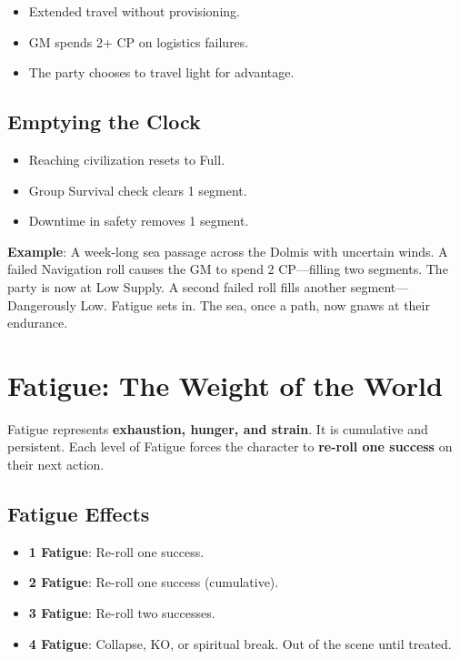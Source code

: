 \begin{itemize}
    \item Extended travel without provisioning.
    \item GM spends 2+ CP on logistics failures.
    \item The party chooses to travel light for advantage.
\end{itemize}

\subsection*{Emptying the Clock}

\begin{itemize}
    \item Reaching civilization resets to Full.
    \item Group Survival check clears 1 segment.
    \item Downtime in safety removes 1 segment.
\end{itemize}

\textbf{Example}: A week-long sea passage across the Dolmis with uncertain winds. A failed Navigation roll causes the GM to spend 2 CP---filling two segments. The party is now at Low Supply. A second failed roll fills another segment---Dangerously Low. Fatigue sets in. The sea, once a path, now gnaws at their endurance.

\section*{Fatigue: The Weight of the World}

Fatigue represents \textbf{exhaustion, hunger, and strain}. It is cumulative and persistent. Each level of Fatigue forces the character to \textbf{re-roll one success} on their next action.

\subsection*{Fatigue Effects}

\begin{itemize}
    \item \textbf{1 Fatigue}: Re-roll one success.
    \item \textbf{2 Fatigue}: Re-roll one success (cumulative).
    \item \textbf{3 Fatigue}: Re-roll two successes.
    \item \textbf{4 Fatigue}: Collapse, KO, or spiritual break. Out of the scene until treated.
\end{itemize}


